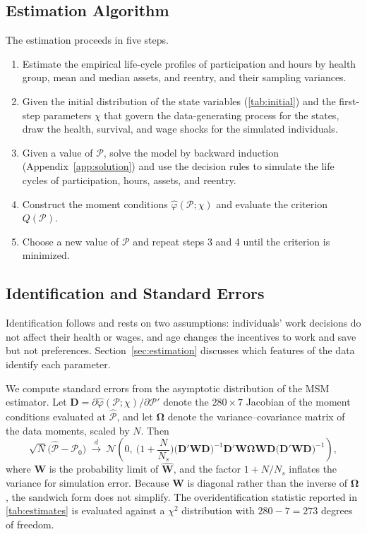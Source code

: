 \subsection{Estimation Algorithm}

The estimation proceeds in five steps.
\begin{enumerate}[label=\arabic*.]
\item Estimate the empirical life-cycle profiles of participation and hours by health group, mean and median assets, and reentry, and their sampling variances.
\item Given the initial distribution of the state variables (\autoref{tab:initial}) and the first-step parameters $\chi$ that govern the data-generating process for the states, draw the health, survival, and wage shocks for the simulated individuals.
\item Given a value of $\mathcal{P}$, solve the model by backward induction (Appendix~\ref{app:solution}) and use the decision rules to simulate the life cycles of participation, hours, assets, and reentry.
\item Construct the moment conditions $\hat{\varphi}(\mathcal{P};\chi)$ and evaluate the criterion $Q(\mathcal{P})$.
\item Choose a new value of $\mathcal{P}$ and repeat steps 3 and 4 until the criterion is minimized.
\end{enumerate}

\subsection{Identification and Standard Errors}

Identification follows \citet{french2005effects} and rests on two assumptions: individuals' work decisions do not affect their health or wages, and age changes the incentives to work and save but not preferences. Section~\ref{sec:estimation} discusses which features of the data identify each parameter.

We compute standard errors from the asymptotic distribution of the MSM estimator. Let $\mathbf{D}=\partial\hat{\varphi}(\mathcal{P};\chi)/\partial\mathcal{P}'$ denote the $280\times7$ Jacobian of the moment conditions evaluated at $\hat{\mathcal{P}}$, and let $\boldsymbol{\Omega}$ denote the variance--covariance matrix of the data moments, scaled by $N$. Then
\[
\sqrt{N}\big(\hat{\mathcal{P}}-\mathcal{P}_0\big)\ \xrightarrow{d}\ \mathcal{N}\!\left(0,\ \Big(1+\frac{N}{N_s}\Big)\big(\mathbf{D}'\mathbf{W}\mathbf{D}\big)^{-1}\mathbf{D}'\mathbf{W}\boldsymbol{\Omega}\mathbf{W}\mathbf{D}\big(\mathbf{D}'\mathbf{W}\mathbf{D}\big)^{-1}\right),
\]
where $\mathbf{W}$ is the probability limit of $\hat{\mathbf{W}}$, and the factor $1+N/N_s$ inflates the variance for simulation error. Because $\mathbf{W}$ is diagonal rather than the inverse of $\boldsymbol{\Omega}$, the sandwich form does not simplify. The overidentification statistic reported in \autoref{tab:estimates} is evaluated against a $\chi^2$ distribution with $280-7=273$ degrees of freedom.

